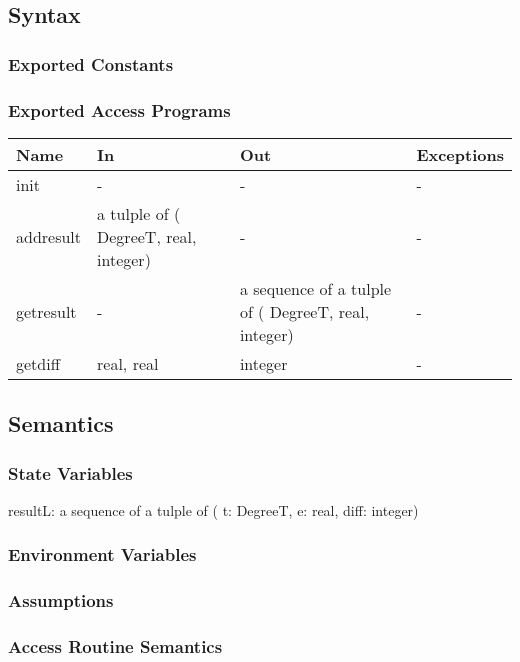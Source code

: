 \documentclass[12pt, titlepage]{article}
\begin{document}
\subsection{Syntax}

\subsubsection{Exported Constants}


\subsubsection{Exported Access Programs}

\begin{center}
\begin{tabular}{p{2cm} p{5cm} p{5cm} p{2cm}}
\hline
\textbf{Name} & \textbf{In} & \textbf{Out} & \textbf{Exceptions} \\
\hline 
init & - & - & - \\
addresult & a tulple of ( DegreeT, real, integer) & - & - \\
getresult & - & a sequence of a tulple of ( DegreeT, real, integer) & - \\
getdiff & real, real & integer & - \\


\hline
\end{tabular}
\end{center}


\subsection{Semantics}

\subsubsection{State Variables}
resultL: a sequence of a tulple of ( t: DegreeT, e: real, diff: integer)\\


\subsubsection{Environment Variables}


\subsubsection{Assumptions}


\subsubsection{ Access Routine Semantics}
\end{document}
